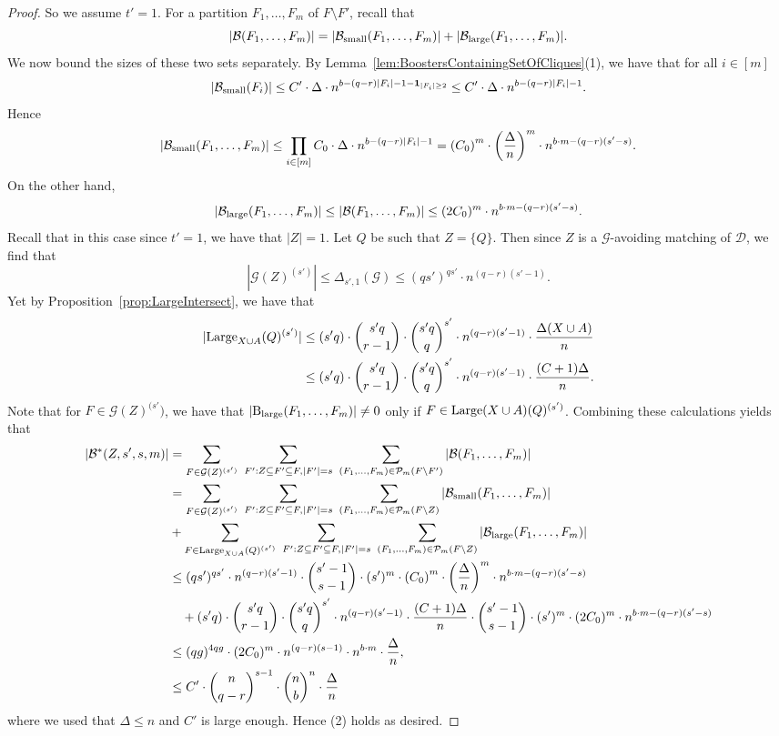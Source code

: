 \documentclass[11pt]{article}
\newcommand{\mc}[1]{\mathcal{#1}}
\newcounter{i}
\theoremstyle{plain}
\theoremstyle{plain} %
\theoremstyle{definition}
\begin{document}
\begin{proof}
So we assume $t'=1$. For a partition $F_1,\ldots, F_{m}$ of $F\setminus F'$, recall that 
$$|\mc{B}(F_1,\ldots, F_{m})| = |\mc{B}_{\rm small}(F_1,\ldots, F_{m})|+|\mc{B}_{\rm large}(F_1,\ldots, F_{m})|.$$
We now bound the sizes of these two sets separately.  By Lemma~\ref{lem:BoostersContainingSetOfCliques}(1), we have that for all $i\in [m]$
$$|\mc{B}_{\rm small}(F_i)| \le C'\cdot \Delta\cdot n^{b-(q-r)|F_i|-1-{\bf 1}_{|F_i|\ge 2}} \le  C'\cdot \Delta\cdot n^{b-(q-r)|F_i|-1} .$$
Hence 
$$|\mc{B}_{\rm small}(F_1,\ldots, F_{m})| \le \prod_{i\in [m]} C_0\cdot \Delta\cdot n^{b-(q-r)|F_i|-1} = \left(C_0\right)^{m}\cdot \left(\frac{\Delta}{n}\right)^{m} \cdot n^{b\cdot m-(q-r)(s'-s)} .$$
On the other hand,
$$|\mc{B}_{\rm large}(F_1,\ldots, F_{m})| \le |\mc{B}(F_1,\ldots,F_m)| \le (2C_0)^{m} \cdot n^{b\cdot m-(q-r)(s'-s)}.$$
Recall that in this case since $t'=1$, we have that $|Z|=1$. Let $Q$ be such that $Z=\{Q\}$. Then since $Z$ is a $\mc{G}$-avoiding matching of $\mc{D}$, we find that
$$|\mc{G}(Z)^{(s')}| \le \Delta_{s',1}(\mc{G}) \le (qs')^{qs'}\cdot n^{(q-r)(s'-1)}.$$ 
Yet by Proposition~\ref{prop:LargeIntersect}, we have that
\begin{align*}
|{\rm Large}_{X\cup A}(Q)^{(s')}| &\le (s'q)\cdot \binom{s'q}{r-1}\cdot \binom{s'q}{q}^{s'}\cdot n^{(q-r)(s'-1)}\cdot \frac{\Delta(X\cup A)}{n} \\
&\le (s'q)\cdot \binom{s'q}{r-1}\cdot \binom{s'q}{q}^{s'}\cdot n^{(q-r)(s'-1)}\cdot \frac{(C+1)\Delta}{n}.
\end{align*}
Note that for $F\in \mc{G}(Z)^{(s'})$, we have that $|{\rm B}_{\rm large}(F_1,\ldots, F_{m})|\ne 0$ only if $F\in {\rm Large}(X\cup A)(Q)^{(s')}$. Combining these calculations yields that
\begin{align*}
|\mc{B}^{*}(Z,s',s,m)| &= \sum_{F\in \mc{G}(Z)^{(s')}}~\sum_{F': Z\subseteq F' \subseteq F, |F'|=s}~\sum_{(F_1,\ldots, F_{m})\in \mc{P}_{m}(F\setminus F')} |\mc{B}(F_1,\ldots, F_{m})| \\
&= \sum_{F\in \mc{G}(Z)^{(s')}}~\sum_{F': Z\subseteq F' \subseteq F, |F'|=s}~\sum_{(F_1,\ldots, F_{m})\in \mc{P}_{m}(F\setminus Z)} |\mc{B}_{\rm small}(F_1,\ldots, F_{m})| \\
&+ \sum_{F\in {\rm Large}_{X\cup A}(Q)^{(s')}}~\sum_{F': Z\subseteq F' \subseteq F, |F'|=s}~\sum_{(F_1,\ldots, F_{m})\in \mc{P}_{m}(F\setminus Z)} |\mc{B}_{\rm large}(F_1,\ldots, F_{m})|\\
&\le (qs')^{qs'}\cdot  n^{(q-r)(s'-1)} \cdot \binom{s'-1}{s-1}\cdot (s')^{m}\cdot \left(C_0\right)^{m}\cdot \left(\frac{\Delta}{n}\right)^{m} \cdot n^{b\cdot m-(q-r)(s'-s)} \\
&~~~+ (s'q)\cdot \binom{s'q}{r-1}\cdot \binom{s'q}{q}^{s'}\cdot n^{(q-r)(s'-1)}\cdot \frac{(C+1)\Delta}{n} \cdot \binom{s'-1}{s-1}\cdot (s')^{m} \cdot (2C_0)^{m}\cdot n^{b\cdot m-(q-r)(s'-s)} \\  
&\le (qg)^{4qg}\cdot (2C_0)^{m}\cdot n^{(q-r)(s-1)} \cdot n^{b\cdot m}\cdot \frac{\Delta}{n}, \\
&\le C'\cdot \binom{n}{q-r}^{s-1}\cdot \binom{n}{b}^n \cdot \frac{\Delta}{n}
\end{align*}
where we used that $\Delta \le n$ and $C'$ is large enough. Hence (2) holds as desired.
\end{proof}
\end{document}
